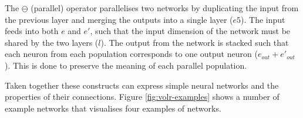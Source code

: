 The $\ominus$ (parallel) operator parallelises two networks by duplicating
the input from the previous layer and merging the outputs into a single
layer ($e5$).
The input feeds into both $e$ and $e'$, such that the input dimension of
the network must be shared by the two layers ($l$). 
The output from the network is stacked such that each neuron from each
population corresponds to one output neuron ($e_{out} + e'_{out}$).
This is done to preserve the meaning of each parallel population.

Taken together these constructs can express simple neural networks and
the properties of their connections. 
Figure \ref{fig:volr-examples} shows a number of example networks
that visualises four examples of networks. 



\FloatBarrier
